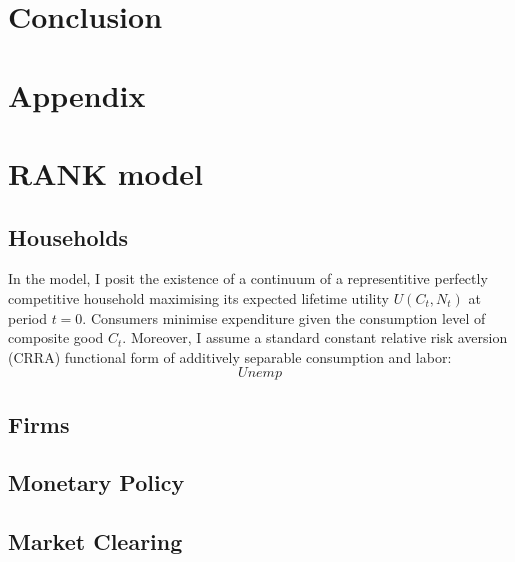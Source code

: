 \documentclass[11pt, a4paper, leqno]{article}
\begin{document}
\section{Conclusion} \label{conclusion}

\clearpage

\printbibliography
{}

\clearpage

\section*{\Huge Appendix}
\appendix
\setcounter{equation}{0}
\section{RANK model}
\subsection{Households}
In the model, I posit the existence of a continuum of a representitive perfectly competitive household maximising its expected lifetime utility $U \left( C_{t},N_{t} \right)$ at period $t = 0$. Consumers minimise expenditure given the consumption level of composite good $C_{t}$. Moreover, I assume a standard constant relative risk aversion (CRRA) functional form of additively separable consumption and labor:
\begin{equation}
    Unemp
\end{equation}

\subsection{Firms}

\subsection{Monetary Policy}

\subsection{Market Clearing}



\end{document}
